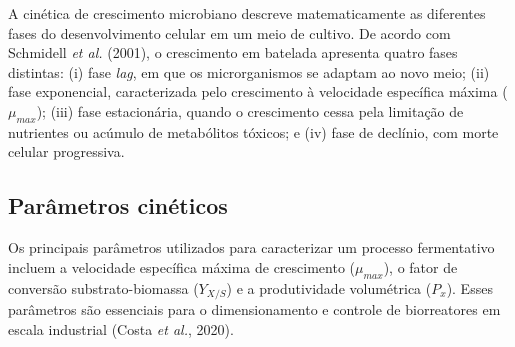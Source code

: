A cinética de crescimento microbiano descreve matematicamente as diferentes fases do desenvolvimento celular em um meio de cultivo. De acordo com Schmidell \textit{et al.} (2001), o crescimento em batelada apresenta quatro fases distintas: (i) fase \textit{lag}, em que os microrganismos se adaptam ao novo meio; (ii) fase exponencial, caracterizada pelo crescimento à velocidade específica máxima ($\mu_{max}$); (iii) fase estacionária, quando o crescimento cessa pela limitação de nutrientes ou acúmulo de metabólitos tóxicos; e (iv) fase de declínio, com morte celular progressiva.

\subsection{Parâmetros cinéticos}

Os principais parâmetros utilizados para caracterizar um processo fermentativo incluem a velocidade específica máxima de crescimento ($\mu_{max}$), o fator de conversão substrato-biomassa ($Y_{X/S}$) e a produtividade volumétrica ($P_x$). Esses parâmetros são essenciais para o dimensionamento e controle de biorreatores em escala industrial (Costa \textit{et al.}, 2020).

